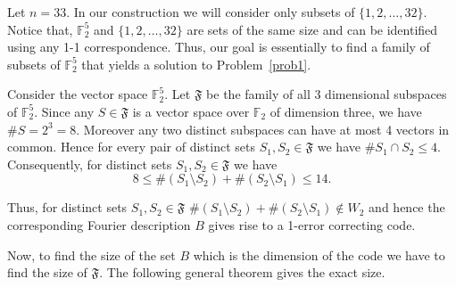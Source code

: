 \documentclass{Rinton-P9x6}
\newcommand{\GF}[2][]{{\ensuremath{\mathbb{F}_{#2}^{#1}}}}
\begin{document}
Let $n = 33$. In our construction we will consider only subsets of
$\{1,2,\ldots,32\}$. Notice that, $\GF[5]{2}$ and $\{1,2,\ldots,32\}$
are sets of the same size and can be identified using any 1-1
correspondence. Thus, our goal is essentially to find a family of
subsets of $\GF[5]{2}$ that yields a solution to Problem~\ref{prob1}.

Consider the vector space $\GF[5]{2}$. Let $\mathfrak{F}$ be the
family of all 3 dimensional subspaces of $\GF[5]{2}$. Since any $S \in
\mathfrak{F}$ is a vector space over $\GF{2}$ of dimension three, we
have $\# S = 2^3 = 8$.  Moreover any two distinct subspaces can have
at most 4 vectors in common. Hence for every pair of distinct sets $
S_1,S_2 \in \mathfrak{F}$ we have $\# S_1 \cap S_2 \leq 4$.
Consequently, for distinct sets $ S_1,S_2 \in \mathfrak{F}$ we have
\[
8\leq \# (S_1 \setminus S_2) + \# (S_2\setminus S_1) \leq 14.
\]

Thus, for distinct sets $ S_1,S_2 \in \mathfrak{F}$ $\# (S_1 \setminus
S_2) + \# (S_2\setminus S_1)\not\in W_2$ and hence the corresponding
Fourier description $B$ gives rise to a 1-error correcting code. 

Now, to find the size of the set $B$ which is the dimension of the
code we have to find the size of $\mathfrak{F}$. The following general
theorem gives the exact size.
\end{document}
